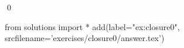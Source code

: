 
\begin{ex} 
  \label{ex:closure0}
  
  \qed
\end{ex} 
\begin{python0}
from solutions import *
add(label="ex:closure0",
    srcfilename='exercises/closure0/answer.tex') 
\end{python0}
